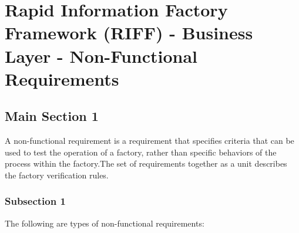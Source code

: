 
\chapter{Rapid Information Factory Framework (RIFF) - Business Layer - Non-Functional Requirements} %

\label{Chapter36} %



\section{Main Section 1}

A non-functional requirement is a requirement that specifies criteria that can be used to test the operation of a factory, rather than specific behaviors of the process within the factory.The set of requirements together as a unit describes the factory verification rules.

\subsection{Subsection 1}

The following are types of non-functional requirements:

